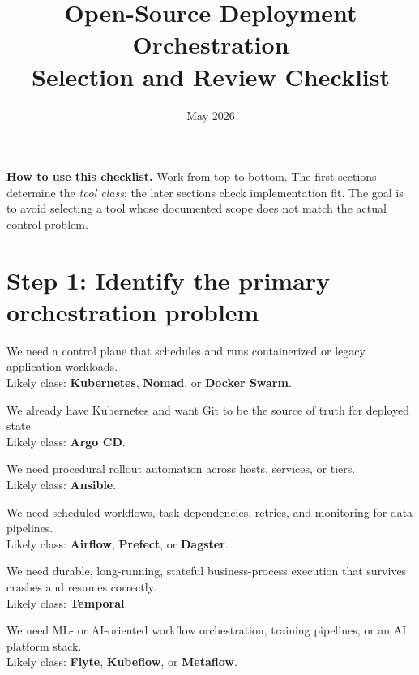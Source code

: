 \documentclass[11pt]{article}
\title{Open-Source Deployment Orchestration\\\large Selection and Review Checklist}
\author{}
\date{May 2026}
\newcommand{\checkbox}{\makebox[1.6em][l]{\(\square\)}}
\newcommand{\tool}[1]{\textbf{#1}}
\begin{document}
\maketitle

\textbf{How to use this checklist.} Work from top to bottom. The first sections determine the \emph{tool class}; the later sections check implementation fit. The goal is to avoid selecting a tool whose documented scope does not match the actual control problem.\cite{KubernetesOverview,ArgoCDHome,AnsiblePlaybooks,AirflowHome,TemporalWhatIs,KubeflowIntro}

\section{Step 1: Identify the primary orchestration problem}
\checkbox We need a control plane that schedules and runs containerized or legacy application workloads.\\
\hspace*{1.2em}Likely class: \tool{Kubernetes}, \tool{Nomad}, or \tool{Docker Swarm}.\cite{KubernetesOverview,NomadWhatIs,DockerSwarm}

\checkbox We already have Kubernetes and want Git to be the source of truth for deployed state.\\
\hspace*{1.2em}Likely class: \tool{Argo CD}.\cite{ArgoCDHome,ArgoCDDeclarative}

\checkbox We need procedural rollout automation across hosts, services, or tiers.\\
\hspace*{1.2em}Likely class: \tool{Ansible}.\cite{AnsiblePlaybooks,AnsibleRolling}

\checkbox We need scheduled workflows, task dependencies, retries, and monitoring for data pipelines.\\
\hspace*{1.2em}Likely class: \tool{Airflow}, \tool{Prefect}, or \tool{Dagster}.\cite{AirflowHome,PrefectQuickstart,DagsterOverview}

\checkbox We need durable, long-running, stateful business-process execution that survives crashes and resumes correctly.\\
\hspace*{1.2em}Likely class: \tool{Temporal}.\cite{TemporalWhatIs,TemporalWorkflowExecution}

\checkbox We need ML- or AI-oriented workflow orchestration, training pipelines, or an AI platform stack.\\
\hspace*{1.2em}Likely class: \tool{Flyte}, \tool{Kubeflow}, or \tool{Metaflow}.\cite{FlyteOSS,KubeflowIntro,MetaflowWhatIs}
\end{document}
